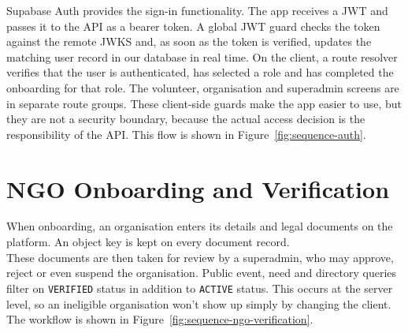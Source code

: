 
Supabase Auth provides the sign-in functionality. The app receives a JWT and passes it to the API as a bearer token. A global JWT guard checks the token against the remote JWKS and, as soon as the token is verified, updates the matching user record in our database in real time. On the client, a route resolver verifies that the user is authenticated, has selected a role and has completed the onboarding for that role. The volunteer, organisation and superadmin screens are in separate route groups. These client-side guards make the app easier to use, but they are not a security boundary, because the actual access decision is the responsibility of the API. This flow is shown in Figure~\ref{fig:sequence-auth}.

\section{NGO Onboarding and Verification}
\label{sec:impl-verification}


When onboarding, an organisation enters its details and legal documents on the platform. An object key is kept on every document record. \\ These documents are then taken for review by a superadmin, who may approve, reject or even suspend the organisation. Public event, need and directory queries filter on \texttt{VERIFIED} status in addition to \texttt{ACTIVE} status. This occurs at the server level, so an ineligible organisation won't show up simply by changing the client. The workflow is shown in Figure~\ref{fig:sequence-ngo-verification}.

